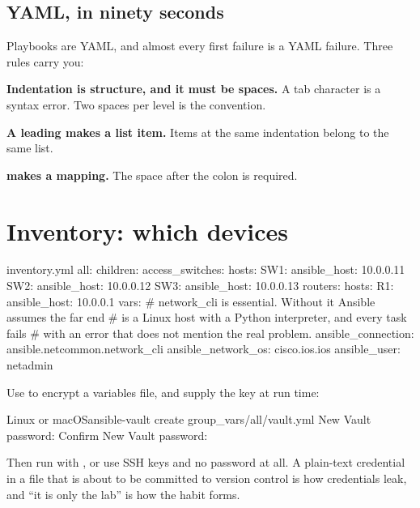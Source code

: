 \subsection{YAML, in ninety seconds}

Playbooks are YAML, and almost every first failure is a YAML failure. Three rules
carry you:

\begin{tight}
  \item \textbf{Indentation is structure, and it must be spaces.} A tab character
        is a syntax error. Two spaces per level is the convention.
  \item \textbf{A leading \cmd{-} makes a list item.} Items at the same
        indentation belong to the same list.
  \item \textbf{ makes a mapping.} The space after the colon is
        required.
\end{tight}

\section{Inventory: which devices}

\begin{playbook}{inventory.yml}
all:
  children:
    access_switches:
      hosts:
        SW1: { ansible_host: 10.0.0.11 }
        SW2: { ansible_host: 10.0.0.12 }
        SW3: { ansible_host: 10.0.0.13 }
    routers:
      hosts:
        R1: { ansible_host: 10.0.0.1 }
  vars:
    # network_cli is essential. Without it Ansible assumes the far end
    # is a Linux host with a Python interpreter, and every task fails
    # with an error that does not mention the real problem.
    ansible_connection: ansible.netcommon.network_cli
    ansible_network_os: cisco.ios.ios
    ansible_user: netadmin
\end{playbook}

\begin{alertbox}
Use  to encrypt a variables file, and supply the key at run
time:

\begin{hostcmd}{Linux or macOS}{ansible-vault create group\_vars/all/vault.yml}
New Vault password:
Confirm New Vault password:
\end{hostcmd}

Then run with , or use SSH keys and no password at all. A
plain-text credential in a file that is about to be committed to version control
is how credentials leak, and ``it is only the lab'' is how the habit forms.
\end{alertbox}

